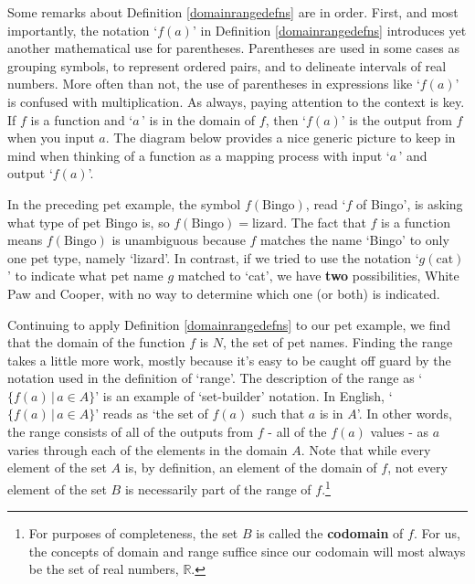 \documentclass{ximera}
\begin{document}
Some remarks about Definition \ref{domainrangedefns} are in order.  First, and most importantly, the notation `$f(a)$' in Definition \ref{domainrangedefns}  introduces yet another mathematical use for parentheses.  Parentheses are used in some cases as grouping symbols, to represent ordered pairs, and to delineate intervals of real numbers.  More often than not, the use of parentheses in expressions like `$f(a)$' is confused with multiplication.   As always, paying attention to the context is key.  If $f$ is a function and `$a\,$' is in the domain of $f$, then `$f(a)$'  is the output from $f$ when you input $a$.  The diagram below provides a nice generic picture to keep in mind when thinking of a function as a mapping process with input `$a\,$' and output `$f(a)$'.






In the preceding pet example, the symbol $f(\text{Bingo})$, read `$f$ of Bingo', is asking what type of pet Bingo is, so $f(\text{Bingo}) = \text{lizard}$.  The fact that $f$ is a function means $f(\text{Bingo})$ is unambiguous because $f$ matches the name `Bingo' to only one pet type, namely `lizard'. In contrast, if we tried to use the notation `$g(\text{cat})$' to indicate what pet name $g$ matched to `cat', we have \textbf{two} possibilities, White Paw and Cooper, with no way to determine which one (or both) is indicated.  

Continuing to apply Definition \ref{domainrangedefns} to our pet example, we find that the domain of the function $f$ is $N$, the set of pet names.  Finding the range takes a little more work, mostly because it's easy to be caught off guard by the notation used in the definition of `range'.  The description of the range as `$\{ f(a) \, | \, a \in A \}$' is an example of `set-builder' notation.  In English,  `$\{ f(a) \, | \, a \in A \}$'  reads as `the set of $f(a)$ such that $a$ is in $A$'.  In other words, the range consists of all of the outputs from $f$ - all of the $f(a)$ values - as $a$ varies through each of the elements in the domain $A$.   Note that while every element of the set $A$ is, by definition, an element of the domain of $f$, not every element of the set $B$ is necessarily part of the range of $f$.\footnote{For purposes of completeness, the set $B$ is called the  \textbf{codomain} of $f$.  For us, the concepts of domain and range suffice since our codomain will most always be the set of real numbers, $\mathbb{R}$.}
\end{document}
